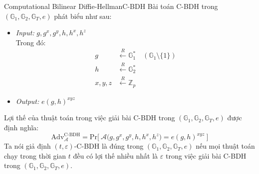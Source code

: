 \documentclass[class=report, crop=false]{standalone}
\begin{document}
		\begin{problem}{Computational Bilinear Diffie-Hellman}{C-BDH}
			Bài toán C-BDH trong $(\mathbb{G}_1, \mathbb{G}_2, \mathbb{G}_T, e)$ phát biểu như sau:
			\vspace{-\baselineskip}
			\begin{itemize}[leftmargin=1.5cm, itemindent=-0.5cm]
				\item[] \textit{Input:} $g, g^x, g^y, h, h^x, h^z$ \\
				Trong đó: \vspace{-\baselineskip}
				\begin{align*}
					g 			&\xleftarrow{R} \mathbb{G}_1^* \quad (\mathbb{G}_1 \setminus \{1\}) \\
					h 			&\xleftarrow{R} \mathbb{G}_2^* 										\\
					x, y, z 	&\xleftarrow{R} \mathbb{Z}_p
				\end{align*}
				\item[] \textit{Output:} $e(g, h)^{xyz}$
			\end{itemize}
			\vspace{-\baselineskip}\par
			Lợi thế của thuật toán \algo trong việc giải bài C-BDH trong $(\mathbb{G}_1, \mathbb{G}_2, \mathbb{G}_T, e)$ được định nghĩa:
			\[
				\text{Adv}_{\mathcal{A}}^{\text{C-BDH}} = \text{Pr}\bigg[ \ \mathcal{A}\Big(g, g^x, g^y, h, h^x, h^z \Big) = e(g, h)^{xyz} \ \bigg]
			\] \indent
			Ta nói giả định $(t, \varepsilon)$-C-BDH là đúng trong $(\mathbb{G}_1, \mathbb{G}_2, \mathbb{G}_T, e)$ nếu mọi thuật toán chạy trong thời gian $t$ đều có lợi thế nhiều nhất là $\varepsilon$ trong việc giải bài C-BDH trong $(\mathbb{G}_1, \mathbb{G}_2, \mathbb{G}_T, e)$.
		\end{problem}
\end{document}
